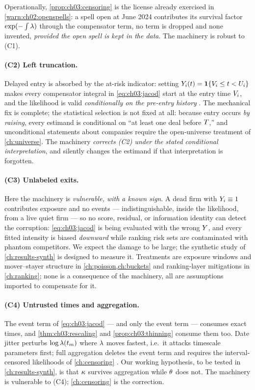 Operationally, \cref{prop:ch03:censoring} is the license already
exercised in \cref{warn:ch02:openspells}: a spell open at June 2024
contributes its survival factor $\exp(-\int \lambda)$ through the
compensator term, no term is dropped and none invented, \emph{provided
the open spell is kept in the data}. The machinery is robust to (C1).

\paragraph{(C2) Left truncation.}
Delayed entry is absorbed by the at-risk indicator: setting
$Y_i(t) = \mathbf{1}\{V_i \le t < U_i\}$ makes every compensator
integral in \cref{eq:ch03:jacod} start at the entry time $V_i$, and
the likelihood is valid \emph{conditionally on the pre-entry history}
\citep{keiding1990,kalbfleisch2002}. The mechanical fix is complete; the
statistical selection is not fixed at all: because entry occurs
\emph{by raising}, every estimand is conditional on ``at least one deal
before $T$,'' and unconditional statements about companies require
the open-universe treatment of \cref{ch:universe}. The machinery
\emph{corrects (C2) under the stated conditional interpretation}, and
silently changes the estimand if that interpretation is forgotten.

\paragraph{(C3) Unlabeled exits.}
Here the machinery is \emph{vulnerable, with a known sign}. A dead firm
with $Y_i \equiv 1$ contributes exposure and no events ---
indistinguishable, inside the likelihood, from a live quiet firm --- so no
score, residual, or information identity can detect the corruption:
\cref{eq:ch03:jacod} is being evaluated with the wrong $Y$, and
every fitted intensity is biased \emph{downward} while ranking risk sets
are contaminated with phantom competitors. We expect the damage to be
large; the synthetic study of \cref{ch:results-synth} is designed to
measure it.
Treatments are exposure windows and mover--stayer structure in
\cref{ch:poisson,ch:buckets} and ranking-layer mitigations in
\cref{ch:ranking}; none is a consequence of the machinery, all are
assumptions imported to compensate for it.

\paragraph{(C4) Untrusted times and aggregation.}
The event term of \cref{eq:ch03:jacod} --- and only the event term ---
consumes exact times, and \cref{thm:ch03:rescaling} and
\cref{prop:ch03:thinning} consume them too. Date jitter perturbs
$\log\lambda(t_m)$ where $\lambda$ moves fastest, i.e.\ it attacks timescale
parameters first; full aggregation deletes the event term and requires
the interval-censored likelihoods of \cref{ch:censoring}
\citep{rizoiu2022}. Our working hypothesis, to be tested in
\cref{ch:results-synth}, is that $\kappa$ survives aggregation while
$\theta$ does not. The machinery is vulnerable to (C4);
\cref{ch:censoring} is the correction.

